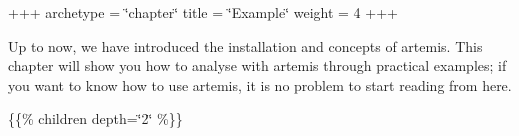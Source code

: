 +++ archetype = \char`\"{}chapter\char`\"{} title = \char`\"{}\+Example\char`\"{} weight = 4 +++

Up to now, we have introduced the installation and concepts of artemis. This chapter will show you how to analyse with artemis through practical examples; if you want to know how to use artemis, it is no problem to start reading from here.

\{\{\% children depth=\char`\"{}2\char`\"{} \%\}\} 